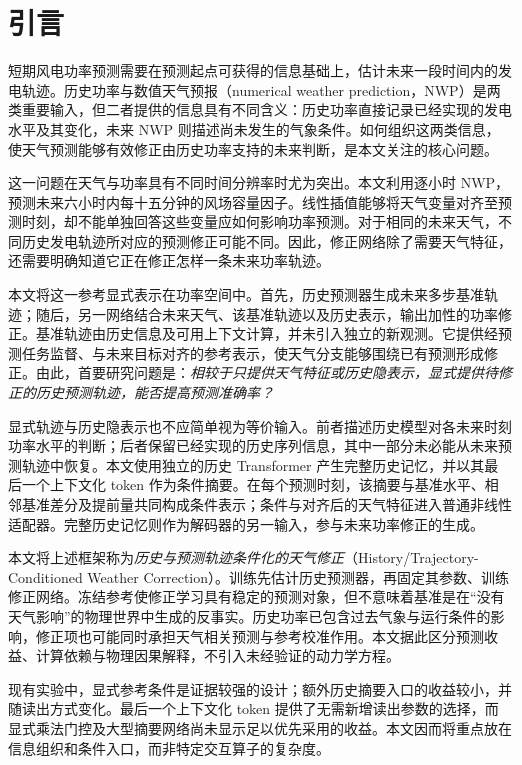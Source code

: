 \section{引言}
\label{sec:introduction}

短期风电功率预测需要在预测起点可获得的信息基础上，估计未来一段时间内的发电轨迹。历史功率与数值天气预报（numerical weather prediction，NWP）是两类重要输入，但二者提供的信息具有不同含义：历史功率直接记录已经实现的发电水平及其变化，未来 NWP 则描述尚未发生的气象条件。如何组织这两类信息，使天气预测能够有效修正由历史功率支持的未来判断，是本文关注的核心问题。

这一问题在天气与功率具有不同时间分辨率时尤为突出。本文利用逐小时 NWP，预测未来六小时内每十五分钟的风场容量因子。线性插值能够将天气变量对齐至预测时刻，却不能单独回答这些变量应如何影响功率预测。对于相同的未来天气，不同历史发电轨迹所对应的预测修正可能不同。因此，修正网络除了需要天气特征，还需要明确知道它正在修正怎样一条未来功率轨迹。

本文将这一参考显式表示在功率空间中。首先，历史预测器生成未来多步基准轨迹；随后，另一网络结合未来天气、该基准轨迹以及历史表示，输出加性的功率修正。基准轨迹由历史信息及可用上下文计算，并未引入独立的新观测。它提供经预测任务监督、与未来目标对齐的参考表示，使天气分支能够围绕已有预测形成修正。由此，首要研究问题是：\emph{相较于只提供天气特征或历史隐表示，显式提供待修正的历史预测轨迹，能否提高预测准确率？}

显式轨迹与历史隐表示也不应简单视为等价输入。前者描述历史模型对各未来时刻功率水平的判断；后者保留已经实现的历史序列信息，其中一部分未必能从未来预测轨迹中恢复。本文使用独立的历史 Transformer 产生完整历史记忆，并以其最后一个上下文化 token 作为条件摘要。在每个预测时刻，该摘要与基准水平、相邻基准差分及提前量共同构成条件表示；条件与对齐后的天气特征进入普通非线性适配器。完整历史记忆则作为解码器的另一输入，参与未来功率修正的生成。

本文将上述框架称为\emph{历史与预测轨迹条件化的天气修正}（History/Trajectory-Conditioned Weather Correction）。训练先估计历史预测器，再固定其参数、训练修正网络。冻结参考使修正学习具有稳定的预测对象，但不意味着基准是在“没有天气影响”的物理世界中生成的反事实。历史功率已包含过去气象与运行条件的影响，修正项也可能同时承担天气相关预测与参考校准作用。本文据此区分预测收益、计算依赖与物理因果解释，不引入未经验证的动力学方程。

现有实验中，显式参考条件是证据较强的设计；额外历史摘要入口的收益较小，并随读出方式变化。最后一个上下文化 token 提供了无需新增读出参数的选择，而显式乘法门控及大型摘要网络尚未显示足以优先采用的收益。本文因而将重点放在信息组织和条件入口，而非特定交互算子的复杂度。

